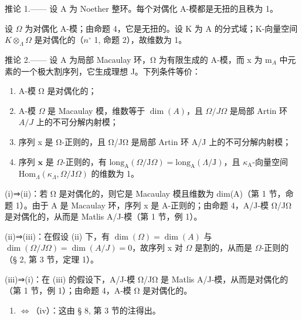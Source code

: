 推论 1.—— 设 A 为 Noether 整环。每个对偶化 A-模都是无扭的且秩为 1。

设 \(\Omega\) 为对偶化 A-模；由命题 4，它是无扭的。设 K 为 A 的分式域；K-向量空间 \(K \otimes_{\Lambda} \Omega\) 是对偶化的（\(n^{\circ}\) 1, 命题 2），故维数为 1。

推论 2.—— 设 A 为局部 Macaulay 环，Ω 为有限生成的 A-模，而 x 为 m\(_{A}\) 中元素的一个极大割序列，它生成理想 J。下列条件等价：

\begin{enumerate}
\def\labelenumi{(\roman{enumi})}
\item
  A-模 Ω 是对偶化的；
\item
  A-模 \(\Omega\) 是 Macaulay 模，维数等于 \(\dim(A)\)，且 \(\Omega/J\Omega\) 是局部 Artin 环 \(A/J\) 上的不可分解内射模；
\item
  序列 x 是 Ω-正则的，且 Ω/JΩ 是局部 Artin 环 A/J 上的不可分解内射模；
\item
  序列 \(\mathbf{x}\) 是 \(\Omega\)-正则的，有 \(\mathrm{long}_{\mathrm{A}}(\Omega/\mathrm{J}\Omega) = \mathrm{long}_{\mathrm{A}}(\Lambda/\mathrm{J})\)，且 \(\kappa_{\mathrm{A}}\)-向量空间 \(\mathrm{Hom}_{\Lambda}(\kappa_{\Lambda}, \Omega/\mathrm{J}\Omega)\) 的维数为 1。
\end{enumerate}

(i)⇒(ii)：若 Ω 是对偶化的，则它是 Macaulay 模且维数为 dim(A)（第 1 节，命题 1）。由于 A 是 Macaulay 环，序列 x 是 A-正则的；由命题 4，A/J-模 Ω/JΩ 是对偶化的，从而是 Matlis A/J-模（第 1 节，例 1）。

(ii)⇒(iii)：在假设 (ii) 下，有 \(\dim(\Omega)=\dim(A)\) 与 \(\dim(\Omega/J\Omega)=\dim(A/J)=0\)，故序列 x 对 \(\Omega\) 是割的，从而是 \(\Omega\)-正则的（§ 2, 第 3 节，定理 1）。

(iii)⇒(i)：在 (iii) 的假设下，A/J-模 Ω/JΩ 是 Matlis A/J-模，从而是对偶化的（第 1 节，例 1）；由命题 4，A-模 Ω 是对偶化的。

\begin{enumerate}
\def\labelenumi{(\roman{enumi})}
\setcounter{enumi}{2}
\tightlist
\item
  \(\Leftrightarrow\)（iv）：这由 § 8, 第 3 节的注得出。
\end{enumerate}

